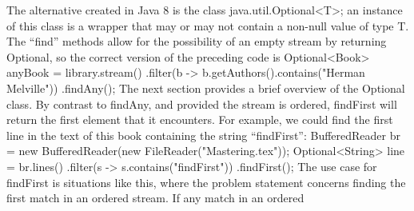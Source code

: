The alternative
created in Java 8 is the class java.util.Optional<T>; an instance of this class is a
wrapper that may or may not contain a non-null value of type T. The “find” methods
allow for the possibility of an empty stream by returning Optional, so the correct
version of the preceding code is
Optional<Book> anyBook = library.stream()
.filter(b -> b.getAuthors().contains("Herman Melville"))
.findAny();
The next section provides a brief overview of the Optional class.
By contrast to findAny, and provided the stream is ordered, findFirst will return
the first element that it encounters. For example, we could find the first line in the text
of this book containing the string “findFirst”:
BufferedReader br = new BufferedReader(new FileReader("Mastering.tex"));
Optional<String> line = br.lines()
.filter(s -> s.contains("findFirst"))
.findFirst();
The use case for findFirst is situations like this, where the problem statement
concerns finding the first match in an ordered stream. If any match in an ordered
